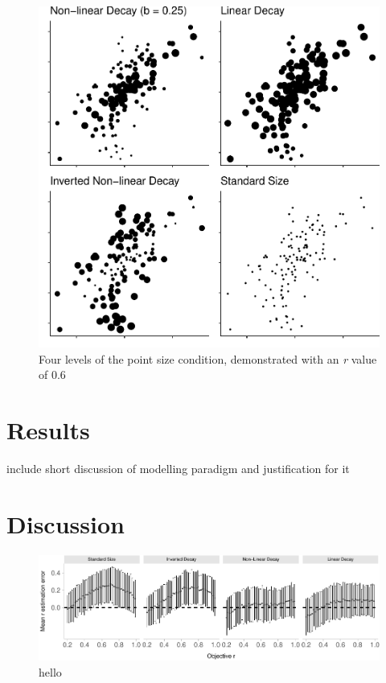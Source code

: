 \documentclass{vgtc}                          %
\begin{document}
\begin{figure}
\centering
\includegraphics{size_and_scatterplots_files/figure-latex/examples-1.pdf}
\caption{\label{fig:examples}Four levels of the point size condition, demonstrated with an \textit{r} value of 0.6}
\end{figure}

\hypertarget{results}{%
\section{Results}\label{results}}

include short discussion of modelling paradigm and justification for it

\hypertarget{discussion}{%
\section{Discussion}\label{discussion}}

\begin{figure}

\includegraphics{size_and_scatterplots_files/figure-latex/changes-with-r-size-1} \hfill{}

\caption{hello}\label{fig:changes-with-r-size}
\end{figure}
\end{document}
